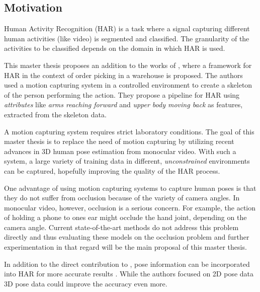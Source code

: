 \documentclass[twoside]{article}
\begin{document}
\begin{multicols}{2} %

\section{Motivation}
\label{sec:motivation}
Human Activity Recognition (HAR) is a task where a signal capturing different human activities (like video) is segmented and classified.
The granularity of the activities to be classified depends on the domain in which HAR is used. 

This master thesis proposes an addition to the works of \cite{reining_towards_2018}, where a framework for HAR in the context of order picking in a warehouse is proposed.
The authors used a motion capturing system in a controlled environment to create a skeleton of the person performing the action.
They propose a pipeline for HAR using \textit{attributes} like \textit{arms reaching forward} and \textit{upper body moving back} as features, extracted from the skeleton data.

A motion capturing system requires strict laboratory conditions.
The goal of this master thesis is to replace the need of motion capturing by utilizing recent advances in 3D human pose estimation from monocular video.
With such a system, a large variety of training data in different, \textit{unconstrained} environments can be captured, hopefully improving the quality of the HAR process.

One advantage of using motion capturing systems to capture human poses is that they do not suffer from occlusion because of the variety of camera angles.
In monocular video, however, occlusion is a serious concern.
For example, the action of holding a phone to ones ear might occlude the hand joint, depending on the camera angle.
Current state-of-the-art methods do not address this problem directly and thus evaluating these models on the occlusion problem and further experimentation in that regard will be the main proposal of this master thesis.

In addition to the direct contribution to \cite{reining_towards_2018}, pose information can be incorporated into HAR for more accurate results \cite{khalid_multi-modal_2018}.
While the authors focused on 2D pose data 3D pose data could improve the accuracy even more. 


\end{multicols}
\end{document}
